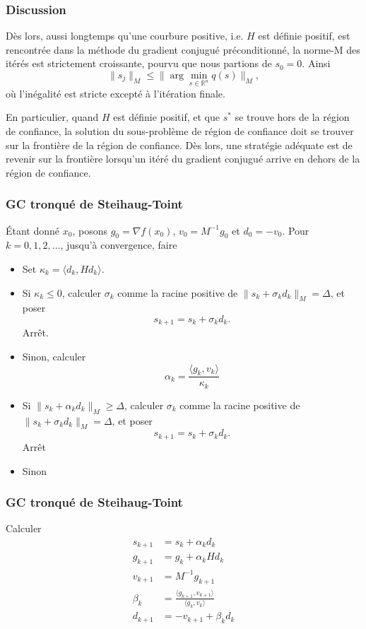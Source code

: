\documentclass[usepdftitle=false,aspectratio=169]{beamer}
\begin{document}
\begin{frame}
\frametitle{Discussion}

Dès lors, aussi longtemps qu'une courbure positive, i.e. $H$ est définie positif, est rencontrée dans la méthode du gradient conjugué préconditionné, la norme-M des itérés est strictement croissante, pourvu que nous partions de $s_0 = 0$.
Ainsi
$$
\| s_j \|_M \leq \| \arg \min_{s \in \mathbb{R}^n} q(s) \|_M,
$$
où l'inégalité est stricte excepté à l'itération finale.

\mbox{}

En particulier, quand $H$ est définie positif, et que $s^*$ se trouve hors de la région de confiance, la solution du sous-problème de région de confiance doit se trouver sur la frontière de la région de confiance.
Dès lors, une stratégie adéquate est de revenir sur la frontière lorsqu'un itéré du gradient conjugué arrive en dehors de la région de confiance.

\end{frame}

\begin{frame}
\frametitle{GC tronqué de Steihaug-Toint}
	
	
Étant donné $x_0$, posons $g_0 = \nabla f(x_0)$, $v_0 = M^{-1} g_0$ et $d_0 = -v_0$.
Pour $k = 0,1,2,\ldots$, jusqu'à convergence, faire
\begin{itemize}
\item
Set $\kappa_k = \langle d_k, Hd_k \rangle$.
\item Si $\kappa_k \leq 0$, calculer $\sigma_k$ comme la racine positive de
$\| s_k + \sigma_k d_k \|_M = \Delta$, et poser
$$
s_{k+1} = s_k + \sigma_kd_k.
$$
Arrêt.
\item
Sinon, calculer
$$
\alpha_k = \frac{\langle g_k, v_k \rangle}{\kappa_k}
$$
\item
Si $\| s_k + \alpha_k d_k \|_M \geq \Delta$,
 calculer $\sigma_k$ comme la racine positive de
$\| s_k + \sigma_k d_k \|_M = \Delta$, et poser
$$
s_{k+1} = s_k + \sigma_kd_k.
$$
Arrêt
\item
Sinon
\end{itemize}

\end{frame}

\begin{frame}
\frametitle{GC tronqué de Steihaug-Toint}
Calculer
	\begin{align*}
	s_{k+1} &= s_k + \alpha_k d_k \\
	g_{k+1} &= g_k + \alpha_k H d_k \\
	v_{k+1} &= M^{-1}g_{k+1} \\
	\beta_k &= \frac{\langle g_{k+1}, v_{k+1} \rangle}{\langle g_k, v_k \rangle} \\
	d_{k+1} &= -v_{k+1} + \beta_k d_k
	\end{align*}
	

\end{frame}
\end{document}

